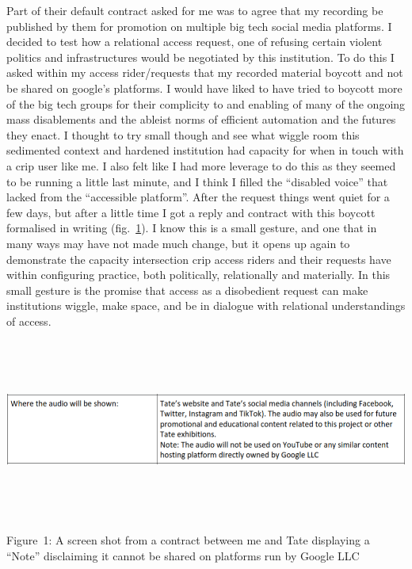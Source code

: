 Part of their default contract asked for me was to agree that my
recording be published by them for promotion on multiple big tech social
media platforms. I decided to test how a relational access request, one
of refusing certain violent politics and infrastructures would be
negotiated by this institution. To do this I asked within my access
rider/requests that my recorded material boycott and not be shared on
google's platforms. I would have liked to have tried to boycott more of
the big tech groups for their complicity to and enabling of many of the
ongoing mass disablements and the ableist norms of efficient automation
and the futures they enact. I thought to try small though and see what
wiggle room this sedimented context and hardened institution had
capacity for when in touch with a crip user like me. I also felt like I
had more leverage to do this as they seemed to be running a little last
minute, and I think I filled the ``disabled voice'' that lacked from the
``accessible platform''. After the request things went quiet for a few
days, but after a little time I got a reply and contract with this
boycott formalised in writing (fig.~\protect\hyperlink{fig:google}{1}).
I know this is a small gesture, and one that in many ways may have not
made much change, but it opens up again to demonstrate the capacity
intersection crip access riders and their requests have within
configuring practice, both politically, relationally and materially. In
this small gesture is the promise that access as a disobedient request
can make institutions wiggle, make space, and be in dialogue with
relational understandings of access.

\includegraphics[width=13.31944in,height=2.33333in]{./media_04_Configure-able_Methods/Pictures/0.png}

Figure~1: A screen shot from a contract between me and Tate displaying a
``Note'' disclaiming it cannot be shared on platforms run by Google LLC

